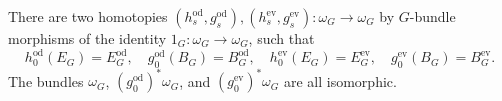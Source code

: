 There are two homotopies $(h_s^{\text{od}}, g_s^{\text{od}}), (h_s^{\text{ev}}, g_s^{\text{ev}}): \omega_G \rightarrow \omega_G$ by $G$-bundle morphisms of the identity $1_G: \omega_G \rightarrow \omega_G$, such that
$$
h_0^{\text{od}}(E_G) = E_G^{\text{od}}, \quad g_0^{\text{od}}(B_G) = B_G^{\text{od}}, \quad h_0^{\text{ev}}(E_G) = E_G^{\text{ev}}, \quad g_0^{\text{ev}}(B_G) = B_G^{\text{ev}}.
$$
The bundles $\omega_G$, $(g_0^{\text{od}})^*\omega_G$, and $(g_0^{\text{ev}})^*\omega_G$ are all isomorphic.
